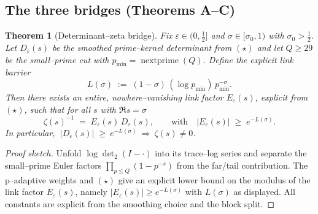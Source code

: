 \documentclass[11pt]{article}
\newtheorem{theorem}{Theorem}
\theoremstyle{definition}
\theoremstyle{remark}
\begin{document}
\subsection*{The three bridges (Theorems A--C)}

\begin{theorem}[Determinant--zeta bridge]\label{thm:det-zeta-bridge}
Fix $\varepsilon\in(0,\tfrac12]$ and $\sigma\in[\sigma_{0},1)$ with $\sigma_{0}>\tfrac12$. Let $D_{\varepsilon}(s)$ be the smoothed prime--kernel determinant from $(\star)$ and let $Q\ge 29$ be the small--prime cut with $p_{\min}=\operatorname{nextprime}(Q)$. Define the explicit link barrier
\[
   L(\sigma)\;:=\;(1-\sigma)\,(\log p_{\min})\,p_{\min}^{-\sigma}.
\]
Then there exists an entire, nowhere--vanishing link factor $E_{\varepsilon}(s)$, explicit from $(\star)$, such that for all $s$ with $\Re s=\sigma$
\[
  \zeta(s)^{-1}\;=\;E_{\varepsilon}(s)\,D_{\varepsilon}(s),
  \qquad
  \text{with}\quad |E_{\varepsilon}(s)|\;\ge\;e^{-L(\sigma)}.
\]
In particular, $\ |D_{\varepsilon}(s)| \;\ge\ e^{-L(\sigma)}\ \Longrightarrow\ \zeta(s)\neq 0$.
\end{theorem}

\begin{proof}[Proof sketch]
Unfold $\log\det_2(I-\cdot)$ into its trace--log series and separate the small--prime Euler factors $\prod_{p\le Q}(1-p^{-s})$ from the far/tail contribution. The p--adaptive weights and $(\star)$ give an explicit lower bound on the modulus of the link factor $E_{\varepsilon}(s)$, namely $|E_{\varepsilon}(s)|\ge e^{-L(\sigma)}$ with $L(\sigma)$ as displayed. All constants are explicit from the smoothing choice and the block split.
\end{proof}
\end{document}
